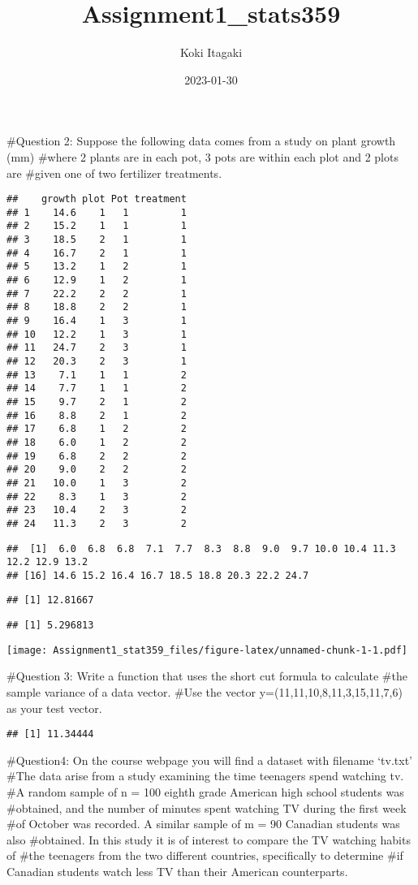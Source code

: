 \documentclass[
]{article}
\title{Assignment1\_stats359}
\author{Koki Itagaki}
\date{2023-01-30}
\begin{document}
\maketitle

\#Question 2: Suppose the following data comes from a study on plant
growth (mm) \#where 2 plants are in each pot, 3 pots are within each
plot and 2 plots are \#given one of two fertilizer treatments.

\begin{verbatim}
##    growth plot Pot treatment
## 1    14.6    1   1         1
## 2    15.2    1   1         1
## 3    18.5    2   1         1
## 4    16.7    2   1         1
## 5    13.2    1   2         1
## 6    12.9    1   2         1
## 7    22.2    2   2         1
## 8    18.8    2   2         1
## 9    16.4    1   3         1
## 10   12.2    1   3         1
## 11   24.7    2   3         1
## 12   20.3    2   3         1
## 13    7.1    1   1         2
## 14    7.7    1   1         2
## 15    9.7    2   1         2
## 16    8.8    2   1         2
## 17    6.8    1   2         2
## 18    6.0    1   2         2
## 19    6.8    2   2         2
## 20    9.0    2   2         2
## 21   10.0    1   3         2
## 22    8.3    1   3         2
## 23   10.4    2   3         2
## 24   11.3    2   3         2
\end{verbatim}

\begin{verbatim}
##  [1]  6.0  6.8  6.8  7.1  7.7  8.3  8.8  9.0  9.7 10.0 10.4 11.3 12.2 12.9 13.2
## [16] 14.6 15.2 16.4 16.7 18.5 18.8 20.3 22.2 24.7
\end{verbatim}

\begin{verbatim}
## [1] 12.81667
\end{verbatim}

\begin{verbatim}
## [1] 5.296813
\end{verbatim}

\texttt{[image: Assignment1\_stat359\_files/figure-latex/unnamed-chunk-1-1.pdf]}

\#Question 3: Write a function that uses the short cut formula to
calculate \#the sample variance of a data vector. \#Use the vector
y=(11,11,10,8,11,3,15,11,7,6) as your test vector.

\begin{verbatim}
## [1] 11.34444
\end{verbatim}

\#Question4: On the course webpage you will find a dataset with filename
`tv.txt' \#The data arise from a study examining the time teenagers
spend watching tv. \#A random sample of n = 100 eighth grade American
high school students was \#obtained, and the number of minutes spent
watching TV during the first week \#of October was recorded. A similar
sample of m = 90 Canadian students was also \#obtained. In this study it
is of interest to compare the TV watching habits of \#the teenagers from
the two different countries, specifically to determine \#if Canadian
students watch less TV than their American counterparts.
\end{document}
